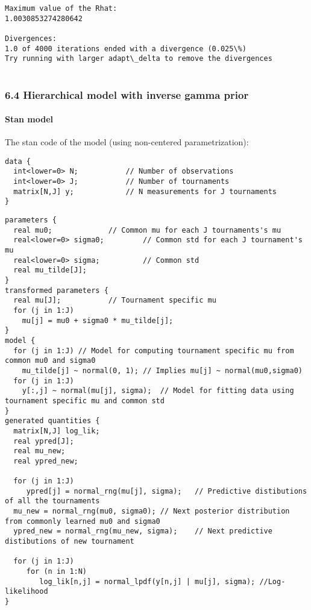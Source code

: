 \documentclass[11pt]{article}
\begin{document}
    \begin{Verbatim}[commandchars=\\\{\}]
Maximum value of the Rhat: 
1.0030853274280642

Divergences:
1.0 of 4000 iterations ended with a divergence (0.025\%)
Try running with larger adapt\_delta to remove the divergences


    \end{Verbatim}

    \hypertarget{hierarchical-model-with-inverse-gamma-prior}{%
\subsubsection{6.4 Hierarchical model with inverse gamma
prior}\label{hierarchical-model-with-inverse-gamma-prior}}

\hypertarget{stan-model}{%
\paragraph{Stan model}\label{stan-model}}

The stan code of the model (using non-centered parametrization):

\begin{verbatim}
data {
  int<lower=0> N;           // Number of observations
  int<lower=0> J;           // Number of tournaments
  matrix[N,J] y;            // N measurements for J tournaments
}
\end{verbatim}

    \begin{verbatim}
parameters {
  real mu0;             // Common mu for each J tournaments's mu
  real<lower=0> sigma0;         // Common std for each J tournament's mu
  real<lower=0> sigma;          // Common std
  real mu_tilde[J];
}
transformed parameters {
  real mu[J];           // Tournament specific mu
  for (j in 1:J)
    mu[j] = mu0 + sigma0 * mu_tilde[j];
}
model {
  for (j in 1:J) // Model for computing tournament specific mu from common mu0 and sigma0
    mu_tilde[j] ~ normal(0, 1); // Implies mu[j] ~ normal(mu0,sigma0)
  for (j in 1:J)
    y[:,j] ~ normal(mu[j], sigma);  // Model for fitting data using tournament specific mu and common std
}
generated quantities {
  matrix[N,J] log_lik;    
  real ypred[J];
  real mu_new;
  real ypred_new;
  
  for (j in 1:J)
     ypred[j] = normal_rng(mu[j], sigma);   // Predictive distibutions of all the tournaments
  mu_new = normal_rng(mu0, sigma0); // Next posterior distribution from commonly learned mu0 and sigma0
  ypred_new = normal_rng(mu_new, sigma);    // Next predictive distibutions of new tournament
  
  for (j in 1:J)
     for (n in 1:N)
        log_lik[n,j] = normal_lpdf(y[n,j] | mu[j], sigma); //Log-likelihood
}

\end{verbatim}
\end{document}
